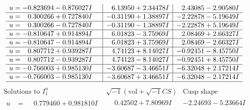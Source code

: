 \documentclass[1p]{elsarticle_modified}
\theoremstyle{definition}
\newcommand{\I}{\sqrt{-1}}
\begin{document}
$$\begin{array}{c|c|c}
\begin{aligned}
u &= -0.823694 - 0.876027 I\end{aligned}
 & \phantom{-}6.13950 + 2.34478 I & \phantom{-}2.43085 - 2.90580 I \\ \hline\begin{aligned}
u &= \phantom{-}0.300266 + 0.727840 I\end{aligned}
 & -0.31190 + 1.38897 I & -2.22878 - 5.19649 I \\ \hline\begin{aligned}
u &= \phantom{-}0.300266 - 0.727840 I\end{aligned}
 & -0.31190 - 1.38897 I & -2.22878 + 5.19649 I \\ \hline\begin{aligned}
u &= -0.810647 + 0.914894 I\end{aligned}
 & \phantom{-}6.01823 - 3.75969 I & \phantom{-}2.08469 + 2.66327 I \\ \hline\begin{aligned}
u &= -0.810647 - 0.914894 I\end{aligned}
 & \phantom{-}6.01823 + 3.75969 I & \phantom{-}2.08469 - 2.66327 I \\ \hline\begin{aligned}
u &= \phantom{-}0.807712 + 0.939287 I\end{aligned}
 & \phantom{-}4.74123 + 8.14027 I & -0.92451 - 8.45750 I \\ \hline\begin{aligned}
u &= \phantom{-}0.807712 - 0.939287 I\end{aligned}
 & \phantom{-}4.74123 - 8.14027 I & -0.92451 + 8.45750 I \\ \hline\begin{aligned}
u &= -0.766003 + 0.985130 I\end{aligned}
 & -3.60687 - 3.46651 I & -6.32048 + 2.17214 I \\ \hline\begin{aligned}
u &= -0.766003 - 0.985130 I\end{aligned}
 & -3.60687 + 3.46651 I & -6.32048 - 2.17214 I\\
 \hline 
 \end{array}$$\newpage$$\begin{array}{c|c|c}  
\text{Solutions to }I^u_{1}& \I (\text{vol} + \sqrt{-1}CS) & \text{Cusp shape}\\
 \hline 
\begin{aligned}
u &= \phantom{-}0.779460 + 0.981810 I\end{aligned}
 & \phantom{-}0.42502 + 7.80969 I & -2.24693 - 5.23664 I \\ \hline\begin{aligned}

\end{aligned}
\end{array}$$
\end{document}
